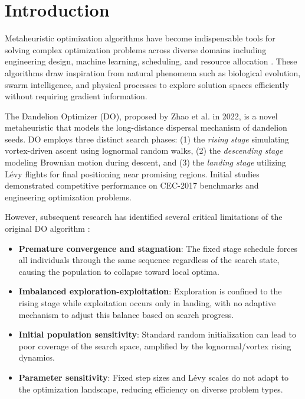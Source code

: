 \documentclass[preprint,12pt]{elsarticle}
\begin{document}
\section{Introduction}
\label{sec:introduction}

Metaheuristic optimization algorithms have become indispensable tools for solving complex optimization problems across diverse domains including engineering design, machine learning, scheduling, and resource allocation \cite{mirjalili2019evolutionary}. These algorithms draw inspiration from natural phenomena such as biological evolution, swarm intelligence, and physical processes to explore solution spaces efficiently without requiring gradient information.

The Dandelion Optimizer (DO), proposed by Zhao et al. \cite{zhao2022dandelion} in 2022, is a novel metaheuristic that models the long-distance dispersal mechanism of dandelion seeds. DO employs three distinct search phases: (1) the \textit{rising stage} simulating vortex-driven ascent using lognormal random walks, (2) the \textit{descending stage} modeling Brownian motion during descent, and (3) the \textit{landing stage} utilizing Lévy flights for final positioning near promising regions. Initial studies demonstrated competitive performance on CEC-2017 benchmarks and engineering optimization problems.

However, subsequent research has identified several critical limitations of the original DO algorithm \cite{biomimetics2024,algorithms2025}:

\begin{itemize}
    \item \textbf{Premature convergence and stagnation}: The fixed stage schedule forces all individuals through the same sequence regardless of the search state, causing the population to collapse toward local optima.
    \item \textbf{Imbalanced exploration-exploitation}: Exploration is confined to the rising stage while exploitation occurs only in landing, with no adaptive mechanism to adjust this balance based on search progress.
    \item \textbf{Initial population sensitivity}: Standard random initialization can lead to poor coverage of the search space, amplified by the lognormal/vortex rising dynamics.
    \item \textbf{Parameter sensitivity}: Fixed step sizes and Lévy scales do not adapt to the optimization landscape, reducing efficiency on diverse problem types.
\end{itemize}
\end{document}
